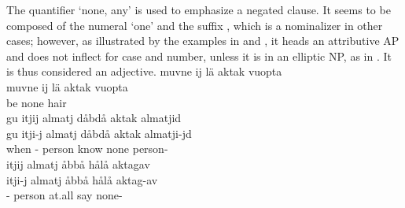 The quantifier  ‘none, any’ is used to emphasize a negated clause. 
It seems to be composed of the numeral  ‘one’ and the suffix , which is a nominalizer in other cases; however, as illustrated by the examples in  and , it heads an attributive AP and does not inflect for case and number, unless it is in an elliptic NP, %
as in . 
It is thus considered an adjective. 
\ea\label{noneEx1}
\glll	muvne ij lä aktak vuopta\\
	muvne ij lä aktak vuopta\\
	 \BS{} be\BS{} none hair\BS{}\\\nopagebreak
{}	
\z
\ea\label{noneEx2}
\glll	gu itjij almatj dåbdå aktak almatjid\\
	gu itji-j almatj dåbdå aktak almatji-jd\\
	when - person\BS{} know\BS{} none person-\\\nopagebreak
{}	
\z
\ea\label{noneEx3}
\glll	itjij almatj åbbå hålå aktagav\\
	itji-j almatj åbbå hålå aktag-av\\
	- person\BS{} at.all say\BS{} none-\\\nopagebreak
{}	
\z

